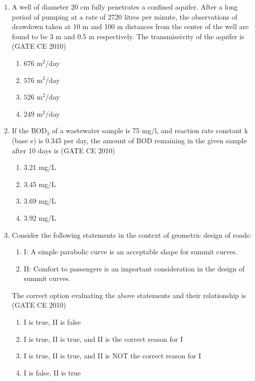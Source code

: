 \documentclass[journal]{IEEEtran}
\begin{document}
\begin{enumerate}
    \item A well of diameter 20 cm fully penetrates a confined aquifer. After a long period of pumping at a rate of 2720 litres per minute, the observations of drawdown taken at  
    10 m and 100 m distances from the center of the well are found to be 3 m and 0.5 m respectively. The transmissivity of the aquifer  
    is \hfill (GATE CE 2010)
    \begin{multicols}{4}
        \begin{enumerate}
            \item $676 \text{ m}^2$/day
            \item $576 \text{ m}^2$/day
            \item $526 \text{ m}^2$/day
            \item $249 \text{ m}^2$/day
        \end{enumerate}
    \end{multicols}

    \item If the BOD$_3$ of a wastewater sample is 75 mg/l, and reaction rate constant k (base e) is 0.345 per day, the amount of BOD remaining in the given sample after 10 days is   \hfill (GATE CE 2010)

    \begin{multicols}{4}
        \begin{enumerate}
            \item 3.21 mg/L
            \item 3.45 mg/L
            \item 3.69 mg/L
            \item 3.92 mg/L
        \end{enumerate}
    \end{multicols}

    \item Consider the following statements in the context of geometric design of roads:
    \begin{enumerate}
        \item[] I: A simple parabolic curve is an acceptable shape for summit curves.
        \item[] II: Comfort to passengers is an important consideration in the design of summit curves.
    \end{enumerate}
    The correct option evaluating the above statements and their relationship is   \hfill (GATE CE 2010)

    \begin{enumerate}
        \item I is true, II is false
        \item I is true, II is true, and II is the correct reason for I
        \item I is true, II is true, and II is NOT the correct reason for I
        \item I is false, II is true
    \end{enumerate}


\end{enumerate}
\end{document}
